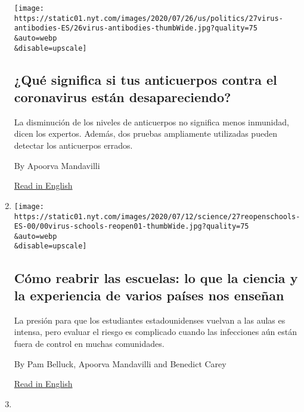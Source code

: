 \begin{enumerate}
  \texttt{[image: https://static01.nyt.com/images/2020/07/26/us/politics/27virus-antibodies-ES/26virus-antibodies-thumbWide.jpg?quality=75\\\&auto=webp\\\&disable=upscale]}

  \hypertarget{quuxe9-significa-si-tus-anticuerpos-contra-el-coronavirus-estuxe1n-desapareciendo}{%
  \subsection{¿Qué significa si tus anticuerpos contra el coronavirus
  están
  desapareciendo?}\label{quuxe9-significa-si-tus-anticuerpos-contra-el-coronavirus-estuxe1n-desapareciendo}}

  La disminución de los niveles de anticuerpos no significa menos
  inmunidad, dicen los expertos. Además, dos pruebas ampliamente
  utilizadas pueden detectar los anticuerpos errados.

  By Apoorva Mandavilli

  \href{https://www.nytimes.com/2020/07/26/health/coronvirus-antibody-tests.html}{Read
  in English}
\item
  \href{/es/2020/07/27/espanol/ciencia-y-tecnologia/regreso-a-clases-coronavirus.html}{}

  \texttt{[image: https://static01.nyt.com/images/2020/07/12/science/27reopenschools-ES-00/00virus-schools-reopen01-thumbWide.jpg?quality=75\\\&auto=webp\\\&disable=upscale]}

  \hypertarget{cuxf3mo-reabrir-las-escuelas-lo-que-la-ciencia-y-la-experiencia-de-varios-pauxedses-nos-enseuxf1an}{%
  \subsection{Cómo reabrir las escuelas: lo que la ciencia y la
  experiencia de varios países nos
  enseñan}\label{cuxf3mo-reabrir-las-escuelas-lo-que-la-ciencia-y-la-experiencia-de-varios-pauxedses-nos-enseuxf1an}}

  La presión para que los estudiantes estadounidenses vuelvan a las
  aulas es intensa, pero evaluar el riesgo es complicado cuando las
  infecciones aún están fuera de control en muchas comunidades.

  By Pam Belluck, Apoorva Mandavilli and Benedict Carey

  \href{https://www.nytimes.com/2020/07/11/health/coronavirus-schools-reopen.html}{Read
  in English}
\item
  \href{/2020/07/26/health/coronvirus-antibody-tests.html}{}


\end{enumerate}
